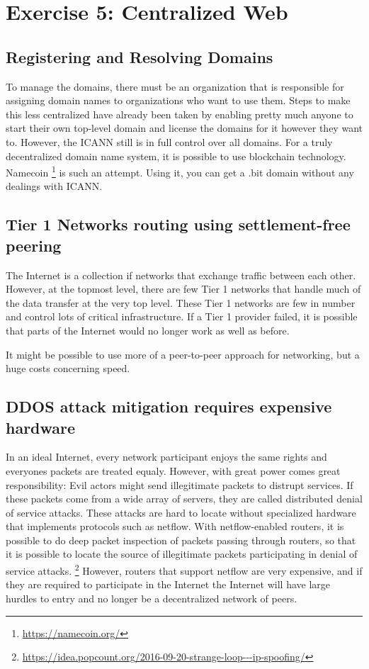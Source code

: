 \documentclass[a4paper]{article}
\begin{document}
\section{Exercise 5: Centralized Web}

\subsection{Registering and Resolving Domains}

To manage the domains, there must be an organization that is responsible for assigning domain names to organizations who want to use them. Steps to make this less centralized have already been taken by enabling pretty much anyone to start their own top-level domain and license the domains for it however they want to. However, the ICANN still is in full control over all domains.
For a truly decentralized domain name system, it is possible to use blockchain technology. Namecoin \footnote{\url{https://namecoin.org/}} is such an attempt. Using it, you can get a .bit domain without any dealings with ICANN.

\subsection{Tier 1 Networks routing using settlement-free peering}

The Internet is a collection if networks that exchange traffic between each other. However, at the topmost level, there are few Tier 1 networks that handle much of the data transfer at the very top level. These Tier 1 networks are few in number and control lots of critical infrastructure. If a Tier 1 provider failed, it is possible that parts of the Internet would no longer work as well as before.

It might be possible to use more of a peer-to-peer approach for networking, but a huge costs concerning speed.

\subsection{DDOS attack mitigation requires expensive hardware}

In an ideal Internet, every network participant enjoys the same rights and everyones packets are treated equaly. However, with great power comes great responsibility: Evil actors might send illegitimate packets to distrupt services. If these packets come from a wide array of servers, they are called distributed denial of service attacks. These attacks are hard to locate without specialized hardware that implements protocols such as netflow. With netflow-enabled routers, it is possible to do deep packet inspection of packets passing through routers, so that it is possible to locate the source of illegitimate packets participating in denial of service attacks. \footnote{\url{https://idea.popcount.org/2016-09-20-strange-loop---ip-spoofing/}}
However, routers that support netflow are very expensive, and if they are required to participate in the Internet the Internet will have large hurdles to entry and no longer be a decentralized network of peers.
\end{document}
